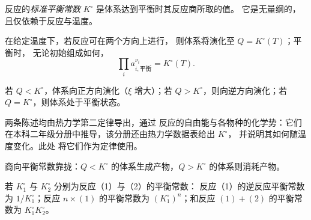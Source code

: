 \begin{definition}[标准平衡常数]\label{def:b1:extent-q-and-k:equilibrium-constant}
反应的\emph{标准平衡常数}
$K^\circ$ 是体系达到平衡时其反应商所取的值。
它是无量纲的，
且仅依赖于反应与温度。
\end{definition}

\begin{theorem}[质量作用定律]\label{thm:b1:extent-q-and-k:mass-action}
在给定温度下，若反应可在两个方向上进行，
则体系将演化至 $Q = K^\circ(T)$；平衡时，
无论初始组成如何，
\[
  \prod_i a_{i,\text{平衡}}^{\nu_i} = K^\circ(T) .
\]
\end{theorem}
\admitted

\begin{proposition}[演化方向]\label{prop:b1:extent-q-and-k:direction}
若 $Q < K^\circ$，体系向正方向演化（$\xi$
增大）；若 $Q > K^\circ$，则向逆方向演化；若
$Q = K^\circ$，则体系处于平衡状态。
\end{proposition}
\admitted

\begin{remark}[这些定律的来源]\label{rem:b1:extent-q-and-k:origin}
两条陈述均由热力学第二定律导出，通过
反应的自由能与各物种的化学势：它们
在本科二年级分册中推导，该分册还由热力学数据表给出 $K^\circ$，
并说明其如何随温度变化。此处
将它们作为定律使用。
\end{remark}

\begin{omfigure}

{\small 商向平衡常数靠拢：$Q <
K^\circ$ 的体系生成产物，$Q > K^\circ$ 的体系则消耗产物。}
\end{omfigure}

\begin{proposition}[平衡常数的组合]\label{prop:b1:extent-q-and-k:combine-k}
若 $K_1^\circ$ 与 $K_2^\circ$ 分别为反应（1）与（2）的平衡常数：
反应（1）的逆反应平衡常数为 $1/K_1^\circ$；反应 $n \times
(1)$ 的平衡常数为 $(K_1^\circ)^n$；和反应 $(1) + (2)$ 的平衡常数为 $K_1^\circ K_2^\circ$。
\end{proposition}

